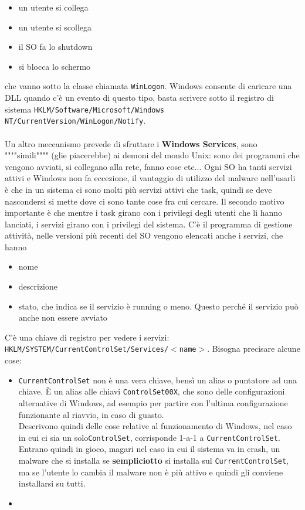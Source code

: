 \documentclass[12pt, oneside]{extbook}
\begin{document}
\begin{itemize}
	\item un utente si collega
	\item un utente si scollega
	\item il SO fa lo shutdown
	\item si blocca lo schermo
\end{itemize}
che vanno sotto la classe chiamata \texttt{WinLogon}. Windows consente di caricare una DLL quando c'è un evento di questo tipo, basta scrivere sotto il registro di sistema \texttt{HKLM/Software/Microsoft/Windows NT/CurrentVersion/WinLogon/Notify}.\\\\Un altro meccanismo prevede di sfruttare i \textbf{Windows Services}, sono """"simili"""" (glie piacerebbe) ai demoni del mondo Unix: sono dei programmi che vengono avviati, si collegano alla rete, fanno cose etc... Ogni SO ha tanti servizi attivi e Windows non fa eccezione, il vantaggio di utilizzo del malware nell'usarli è che in un sistema ci sono molti più servizi attivi che task, quindi se deve nascondersi si mette dove ci sono tante cose fra cui cercare. Il secondo motivo importante è che mentre i task girano con i privilegi degli utenti che li hanno lanciati, i servizi girano con i privilegi del sistema. C'è il programma di gestione attività, nelle versioni più recenti del SO vengono elencati anche i servizi, che hanno
\begin{itemize}
	\item nome
	\item descrizione
	\item stato, che indica se il servizio è running o meno. Questo perché il servizio può anche non essere avviato
\end{itemize}
C'è una chiave di registro per vedere i servizi: \texttt{HKLM/SYSTEM/CurrentControlSet/Services/$<$name$>$}. Bisogna precisare alcune cose:
\begin{itemize}
	\item \texttt{CurrentControlSet} non è una vera chiave, bensì un alias o puntatore ad una chiave. È un alias alle chiavi \texttt{ControlSet00X}, che sono delle configurazioni alternative di Windows, ad esempio per partire con l'ultima configurazione funzionante al riavvio, in caso di guasto.\\Descrivono quindi delle cose relative al funzionamento di Windows, nel caso in cui ci sia un solo\texttt{ControlSet}, corrisponde 1-a-1 a \texttt{CurrentControlSet}. Entrano quindi in gioco, magari nel caso in cui il sistema va in crash, un malware che si installa se \textbf{\textsf{sempliciotto}} si installa sul \texttt{CurrentControlSet}, ma se l'utente lo cambia il malware non è più attivo e quindi gli conviene installarsi su tutti.
	\item 
\end{itemize}
\end{document}
